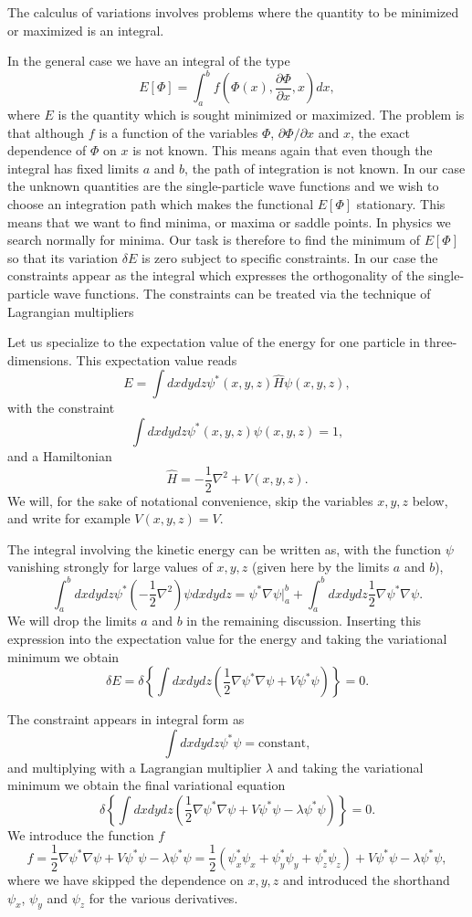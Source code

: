 \documentclass[graybox,sectrefs,envcountresetchap,open=right]{svmonodo}
\begin{document}
The calculus of variations involves 
problems where the quantity to be minimized or maximized is an integral. 

In the general case we have an integral of the type
\[ 
E[\Phi]= \int_a^b f(\Phi(x),\frac{\partial \Phi}{\partial x},x)dx,
\]
where $E$ is the quantity which is sought minimized or maximized.
The problem is that although $f$ is a function of the variables $\Phi$, $\partial \Phi/\partial x$ and $x$, the exact dependence of
$\Phi$ on $x$ is not known.  This means again that even though the integral has fixed limits $a$ and $b$, the path of integration is
not known. In our case the unknown quantities are the single-particle wave functions and we wish to choose an integration path which makes
the functional $E[\Phi]$ stationary. This means that we want to find minima, or maxima or saddle points. In physics we search normally for minima.
Our task is therefore to find the minimum of $E[\Phi]$ so that its variation $\delta E$ is zero  subject to specific
constraints. In our case the constraints appear as the integral which expresses the orthogonality of the  single-particle wave functions.
The constraints can be treated via the technique of Lagrangian multipliers



Let us specialize to the expectation value of the energy for one particle in three-dimensions.
This expectation value reads
\[
  E=\int dxdydz \psi^*(x,y,z) \hat{H} \psi(x,y,z),
\]
with the constraint
\[
 \int dxdydz \psi^*(x,y,z) \psi(x,y,z)=1,
\]
and a Hamiltonian
\[
\hat{H}=-\frac{1}{2}\nabla^2+V(x,y,z).
\]
We will, for the sake of notational convenience,  skip the variables $x,y,z$ below, and write for example $V(x,y,z)=V$.



The integral involving the kinetic energy can be written as, with the function $\psi$ vanishing
strongly for large values of $x,y,z$ (given here by the limits $a$ and $b$), 
 \[
  \int_a^b dxdydz \psi^* \left(-\frac{1}{2}\nabla^2\right) \psi dxdydz = \psi^*\nabla\psi|_a^b+\int_a^b dxdydz\frac{1}{2}\nabla\psi^*\nabla\psi.
\]
We will drop the limits $a$ and $b$ in the remaining discussion. 
Inserting this expression into the expectation value for the energy and taking the variational minimum  we obtain
\[
\delta E = \delta \left\{\int dxdydz\left( \frac{1}{2}\nabla\psi^*\nabla\psi+V\psi^*\psi\right)\right\} = 0.
\]



The constraint appears in integral form as 
\[
 \int dxdydz \psi^* \psi=\mathrm{constant},
\]
and multiplying with a Lagrangian multiplier $\lambda$ and taking the variational minimum we obtain the final variational equation
\[
\delta \left\{\int dxdydz\left( \frac{1}{2}\nabla\psi^*\nabla\psi+V\psi^*\psi-\lambda\psi^*\psi\right)\right\} = 0.
\]
We introduce the function  $f$
\[
  f =  \frac{1}{2}\nabla\psi^*\nabla\psi+V\psi^*\psi-\lambda\psi^*\psi=
\frac{1}{2}(\psi^*_x\psi_x+\psi^*_y\psi_y+\psi^*_z\psi_z)+V\psi^*\psi-\lambda\psi^*\psi,
\]
where we have skipped the dependence on $x,y,z$ and introduced the shorthand $\psi_x$, $\psi_y$ and $\psi_z$  for the various derivatives.
\end{document}
